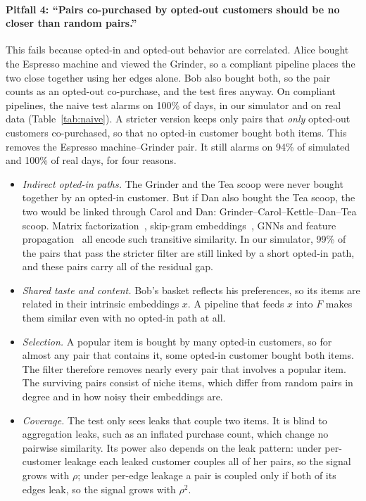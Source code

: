 \documentclass[10pt,twocolumn,letterpaper]{article}
\theoremstyle{definition}
\begin{document}
\paragraph{Pitfall 4: ``Pairs co-purchased by opted-out customers should be no closer than random pairs.''}
This fails because opted-in and opted-out behavior are correlated. Alice
bought the Espresso machine and viewed the Grinder, so a compliant pipeline
places the two close together using her edges alone. Bob also bought both, so
the pair counts as an opted-out co-purchase, and the test fires anyway. On
compliant pipelines, the naive test alarms on 100\% of days, in our simulator
and on real data (Table~\ref{tab:naive}). A stricter version keeps only pairs
that \emph{only} opted-out customers co-purchased, so that no opted-in
customer bought both items. This removes the Espresso machine--Grinder pair.
It still alarms on 94\% of simulated and 100\% of real days, for four reasons.
\begin{itemize}
  \item \emph{Indirect opted-in paths.} The Grinder and the Tea scoop were
        never bought together by an opted-in customer. But if Dan also bought
        the Tea scoop, the two would be linked through Carol and Dan:
        Grinder--Carol--Kettle--Dan--Tea scoop. Matrix
        factorization~\citep{koren2009matrix}, skip-gram
        embeddings~\citep{barkan2016item2vec,levy2014neural}, GNNs and feature
        propagation~\citep{hamilton2017graphsage,he2020lightgcn} all encode
        such transitive similarity. In our simulator, 99\% of the pairs that
        pass the stricter filter are still linked by a short opted-in path, and
        these pairs carry all of the residual gap.
  \item \emph{Shared taste and content.} Bob's basket reflects his
        preferences, so its items are related in their intrinsic embeddings
        $x$. A pipeline that feeds $x$ into $F$ makes them similar even with no
        opted-in path at all.
  \item \emph{Selection.} A popular item is bought by many opted-in
        customers, so for almost any pair that contains it, some opted-in
        customer bought both items. The filter therefore removes nearly every
        pair that involves a popular item. The surviving pairs consist of
        niche items, which differ from random pairs in degree and in how noisy
        their embeddings are.
  \item \emph{Coverage.} The test only sees leaks that couple two items. It is
        blind to aggregation leaks, such as an inflated purchase count, which
        change no pairwise similarity. Its power also depends on the leak
        pattern: under per-customer leakage each leaked customer couples all
        of her pairs, so the signal grows with $\rho$; under per-edge leakage a
        pair is coupled only if both of its edges leak, so the signal grows
        with $\rho^2$.
\end{itemize}
\end{document}
